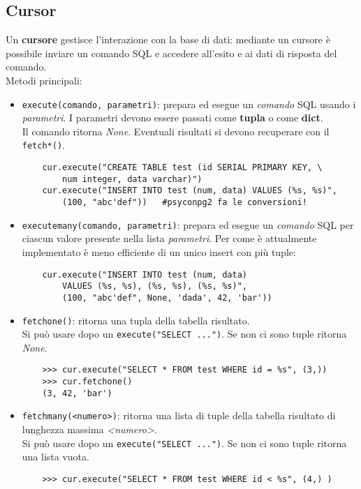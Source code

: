 \documentclass[a4paper, 10pt, titlepage]{article}
\begin{document}
	\subsection{Cursor}
	Un \textbf{cursore} gestisce l'interazione con la base di dati: mediante un cursore è possibile inviare un comando SQL e accedere all'esito e ai dati di risposta del comando.\\
	Metodi principali:
	\begin{itemize}
	\item \lstinline[keywordstyle=\color{black}]|execute(comando, parametri)|: prepara ed esegue un \textit{comando} SQL usando i \textit{parametri}. I parametri devono essere passati come \textbf{tupla} o come \textbf{dict}.\\
	Il comando ritorna \textit{None}. Eventuali risultati si devono recuperare con il \lstinline|fetch*()|.
	\begin{lstlisting}
	cur.execute("CREATE TABLE test (id SERIAL PRIMARY KEY, \ 
		num integer, data varchar)")
	cur.execute("INSERT INTO test (num, data) VALUES (%s, %s)",
		(100, "abc'def"))	#psyconpg2 fa le conversioni!
	\end{lstlisting}
	\item \lstinline|executemany(comando, parametri)|: prepara ed esegue un \textit{comando} SQL per ciascun valore presente nella lista \textit{parametri}. Per come è attualmente implementato è meno efficiente di un unico insert con più tuple:
	\begin{lstlisting}
	cur.execute("INSERT INTO test (num, data) 
		VALUES (%s, %s), (%s, %s), (%s, %s)", 
		(100, "abc'def", None, 'dada', 42, 'bar'))
	\end{lstlisting}
	\item \lstinline|fetchone()|: ritorna una tupla della tabella risultato.\\ Si può usare dopo un \lstinline|execute("SELECT ...")|. Se non ci sono tuple ritorna \textit{None}.
	\begin{lstlisting}
	>>> cur.execute("SELECT * FROM test WHERE id = %s", (3,))
	>>> cur.fetchone()
	(3, 42, 'bar')
	\end{lstlisting}
	\item \lstinline|fetchmany(<numero>)|: ritorna una lista di tuple della tabella risultato di lunghezza massima \textit{<numero>}.\\ Si può usare dopo un \lstinline|execute("SELECT ...")|. Se non ci sono tuple ritorna una lista vuota.
	\begin{lstlisting}
	>>> cur.execute("SELECT * FROM test WHERE id < %s", (4,) )

\end{lstlisting}
\end{itemize}
\end{document}
